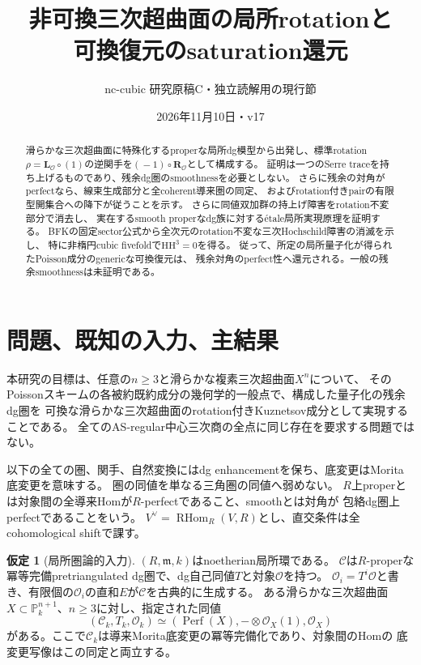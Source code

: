 \documentclass[a4paper,10pt]{ltjsarticle}
\title{非可換三次超曲面の局所rotationと\protect\\可換復元のsaturation還元}
\author{nc-cubic 研究原稿C・独立読解用の現行節}
\date{2026年11月10日・v17}
\theoremstyle{definition}
\newtheorem{hypothesis}[theorem]{仮定}
\theoremstyle{remark}
\newcommand{\Perf}{\operatorname{Perf}}
\newcommand{\RHom}{\operatorname{RHom}}
\newcommand{\OO}{\mathcal O}
\newcommand{\cC}{\mathcal C}
\newcommand{\LL}{\mathbf L}
\newcommand{\RR}{\mathbf R}
\begin{document}
\maketitle
\begin{abstract}
滑らかな三次超曲面に特殊化するproperな局所dg模型から出発し、標準rotation
$\rho=\LL_{\OO}\circ(1)$の逆関手を$(\!-1)\circ\RR_{\OO}$として構成する。
証明は一つのSerre traceを持ち上げるものであり、残余dg圏のsmoothnessを必要としない。
さらに残余の対角がperfectなら、線束生成部分と全coherent導来圏の同定、
およびrotation付きpairの有限型開集合への降下が従うことを示す。
さらに同値双加群の持上げ障害をrotation不変部分で消去し、
実在するsmooth properなdg族に対するétale局所実現原理を証明する。
BFKの固定sector公式から全次元のrotation不変な三次Hochschild障害の消滅を示し、
特に非楕円cubic fivefoldで\(\mathrm{HH}^3=0\)を得る。
従って、所定の局所量子化が得られたPoisson成分のgenericな可換復元は、
残余対角のperfect性へ還元される。一般の残余smoothnessは未証明である。
\end{abstract}
\tableofcontents

\section{問題、既知の入力、主結果}\label{sec:intro}
本研究の目標は、任意の$n\ge3$と滑らかな複素三次超曲面$X^n$について、
そのPoissonスキームの各被約既約成分の幾何学的一般点で、構成した量子化の残余dg圏を
可換な滑らかな三次超曲面のrotation付きKuznetsov成分として実現することである。
全てのAS-regular中心三次商の全点に同じ存在を要求する問題ではない。

以下の全ての圏、関手、自然変換にはdg enhancementを保ち、底変更はMorita底変更を意味する。
圏の同値を単なる三角圏の同値へ弱めない。
$R$上properとは対象間の全導来Homが$R$-perfectであること、smoothとは対角が
包絡dg圏上perfectであることをいう。
$V^\vee=\RHom_R(V,R)$とし、直交条件は全cohomological shiftで課す。

\begin{hypothesis}[局所圏論的入力]\label{hyp:categorical}
$(R,\mathfrak m,k)$はnoetherian局所環である。
$\cC$は$R$-properな冪等完備pretriangulated dg圏で、dg自己同値$T$と対象$\OO$を持つ。
$\OO_i=T^i\OO$と書き、有限個の$\OO_i$の直和$E$が$\cC$を古典的に生成する。
ある滑らかな三次超曲面$X\subset\mathbb P^{n+1}_k$、$n\ge3$に対し、指定された同値
\[
 (\cC_k,T_k,\OO_k)\simeq(\Perf(X),-\otimes\OO_X(1),\OO_X)
 \tag{L}\label{eq:local-input}
\]
がある。ここで$\cC_k$は導来Morita底変更の冪等完備化であり、対象間のHomの
底変更写像はこの同定と両立する。
\end{hypothesis}
\end{document}
